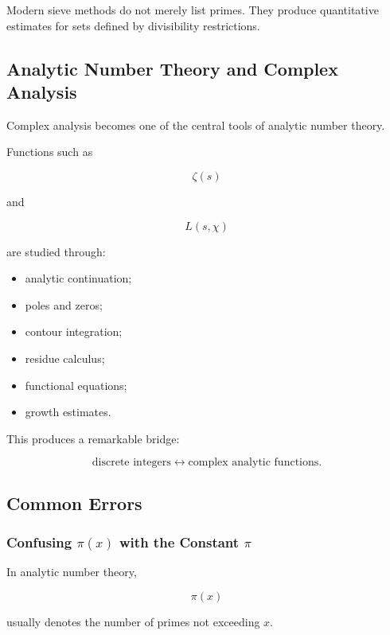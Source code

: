 Modern sieve methods do not merely list primes. They produce quantitative
estimates for sets defined by divisibility restrictions.

\subsection{Analytic Number Theory and Complex Analysis}
\label{subsec:analytic-number-theory-complex-analysis}

Complex analysis becomes one of the central tools of analytic number theory.

Functions such as

\[ \zeta(s) \]

and

\[ L(s,\chi) \]

are studied through:

\begin{itemize}
    \item analytic continuation;
    \item poles and zeros;
    \item contour integration;
    \item residue calculus;
    \item functional equations;
    \item growth estimates.
\end{itemize}

This produces a remarkable bridge:

\[
\boxed{
\text{discrete integers}
\longleftrightarrow
\text{complex analytic functions}.
}
\]

\subsection{Common Errors}
\label{subsec:analytic-number-theory-common-errors}

\subsubsection{Confusing \(\pi(x)\) with the Constant \(\pi\)}

In analytic number theory,

\[ \pi(x) \]

usually denotes the number of primes not exceeding \(x\).

